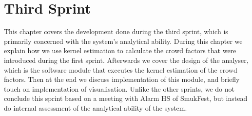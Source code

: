\chapter{Third Sprint}\label{ch:sprint3}

This chapter covers the development done during the third sprint, which is primarily concerned with the system's analytical ability. During this chapter we explain how we use kernel estimation to calculate the crowd factors that were introduced during the first sprint. Afterwards we cover the design of the analyser, which is the software module that executes the kernel estimation of the crowd factors. Then at the end we discuss implementation of this module, and briefly touch on implementation of visualisation. Unlike the other sprints, we do not conclude this sprint based on a meeting with Alarm HS of SmukFest, but instead do internal assessment of the analytical ability of the system.









